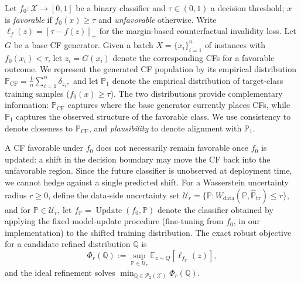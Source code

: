 Let $f_0: \mathcal{X}\to[0,1]$ be a binary classifier and $\tau\in(0,1)$ a decision threshold; $x$ is \emph{favorable} if
$f_0(x)\ge\tau$ and \emph{unfavorable} otherwise. 
Write $\ell_f(z) = [\tau-f(z)]_+$ for the margin-based counterfactual invalidity loss. 
Let $G$ be a base CF generator. Given a batch $X=\{x_i\}_{i=1}^n$ of instances with $f_0(x_i)<\tau$, let $z_i = G(x_i)$ denote the corresponding CFs for a favorable outcome.
We represent the generated CF population by its empirical distribution
$
\mathbb{P}_{\mathrm{CF}} = \frac{1}{n}\sum_{i=1}^n \delta_{z_i},
$
and let $\mathbb{P}_1$ denote the empirical distribution of target-class training samples ($f_0(x)\ge\tau$).
The two distributions provide complementary information: $\mathbb{P}_{\mathrm{CF}}$ captures where the base generator currently places CFs, while $\mathbb{P}_1$ captures the observed structure of the favorable class. 
We use \textcolor{frappe_red}{consistency} to denote closeness to $\mathbb P_{\mathrm{CF}}$, and \emph{plausibility} to denote alignment with $\mathbb P_1$. 

A CF favorable under $f_0$ does not necessarily remain favorable once $f_0$ is updated: a shift in the decision boundary may move the CF back into the unfavorable region. 
Since the future classifier is unobserved at deployment time, we cannot hedge against a single predicted shift.
For a Wasserstein uncertainty radius $r\ge 0$, define the data-side uncertainty set
$
\mathcal U_r
=
\{
\mathbb{P}:
W_{\mathrm{data}}(\mathbb{P},\widehat {\mathbb{P}}_{\mathrm{tr}})\le r
\}
$, and for $\mathbb{P}\in\mathcal U_r$, let
$
f_\mathbb{P}
=
\operatorname{Update}(f_0,\mathbb{P})
$
denote the classifier obtained by applying the fixed model-update procedure (fine-tuning from $f_0$, in our implementation) to the shifted training distribution. %
The exact robust objective for a candidate refined distribution $\mathbb Q$ is 
\begin{equation}
    \Phi_r(\mathbb Q)
:=
\sup_{\mathbb{P}\in\mathcal U_r}
\mathbb E_{z\sim Q}
\left[
\ell_{f_\mathbb{P}}(z)
\right],
\end{equation}
and the ideal refinement solves
$\min_{\mathbb Q\in\mathcal P_2(\mathcal X)}\Phi_r(\mathbb Q)$.


